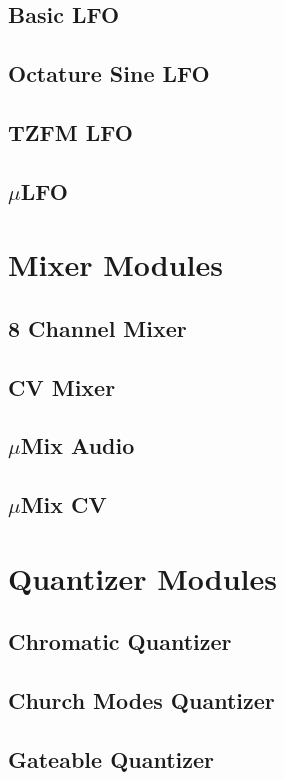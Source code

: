 \documentclass[11pt]{book}
\begin{document}
\section{Basic LFO}
\pagebreak
\section{Octature Sine LFO}
\pagebreak
\section{TZFM LFO}
\pagebreak
\section{$\mu$LFO}
\pagebreak

\chapter{Mixer Modules}
\pagebreak
\section{8 Channel Mixer}
\pagebreak
\section{CV Mixer}
\pagebreak
\section{$\mu$Mix Audio}
\pagebreak
\section{$\mu$Mix CV}
\pagebreak

\chapter{Quantizer Modules}
\pagebreak
\section{Chromatic Quantizer}
\pagebreak
\section{Church Modes Quantizer}
\pagebreak
\section{Gateable Quantizer}
\pagebreak
\end{document}
